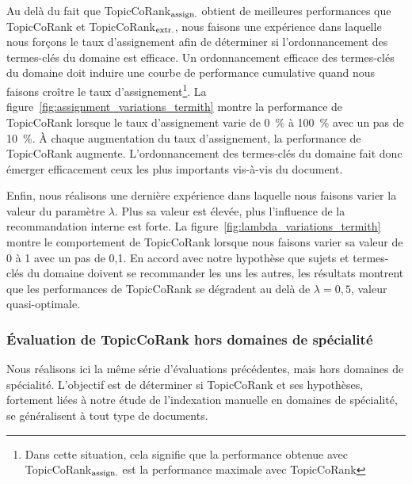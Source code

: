         Au delà du fait que TopicCoRank$_\textnormal{assign.}$ obtient de
        meilleures performances que TopicCoRank et
        TopicCoRank$_\textnormal{extr.}$, nous faisons une expérience dans
        laquelle nous forçons le taux d'assignement afin de déterminer si
        l'ordonnancement des termes-clés du domaine est efficace.
        Un ordonnancement efficace des termes-clés du domaine doit induire une
        courbe de performance cumulative quand nous faisons croître le taux
        d'assignement\footnote{Dans cette situation, cela signifie que la
        performance obtenue avec TopicCoRank$_\textnormal{assign.}$ est la
        performance maximale avec TopicCoRank}. La
        figure~\ref{fig:assignment_variations_termith} montre la performance de
        TopicCoRank lorsque le taux d'assignement varie de 0~\% à 100~\% avec un
        pas de 10~\%. À chaque augmentation du taux d'assignement, la
        performance de TopicCoRank augmente. L'ordonnancement des termes-clés du
        domaine fait donc émerger efficacement ceux les plus
        importants vis-à-vis du document.
        

        Enfin, nous réalisons une dernière expérience dans laquelle nous faisons
        varier la valeur du paramètre $\lambda$. Plus sa valeur est élevée, plus
        l'influence de la recommandation interne est forte. La
        figure~\ref{fig:lambda_variations_termith} montre le comportement de
        TopicCoRank lorsque nous faisons varier sa valeur de 0 à 1
        avec un pas de 0,1. En accord avec notre hypothèse que sujets et
        termes-clés du domaine doivent se recommander les uns les autres, les
        résultats montrent que les performances de TopicCoRank se dégradent au
        delà de $\lambda = 0,5$, valeur quasi-optimale.
        
      
      \subsubsection{Évaluation de TopicCoRank hors domaines de spécialité}
      \label{subsubsec:main-domain_specific_keyphrase_annotation-supervised_automatic_keyphrase_annotation-evaluation-topiccorank_indepent_domains}
        Nous réalisons ici la même série d'évaluations précédentes, mais hors
        domaines de spécialité. L'objectif est de déterminer si TopicCoRank et
        ses hypothèses, fortement liées à notre étude de l'indexation manuelle
        en domaines de spécialité, se généralisent à tout type de documents.

